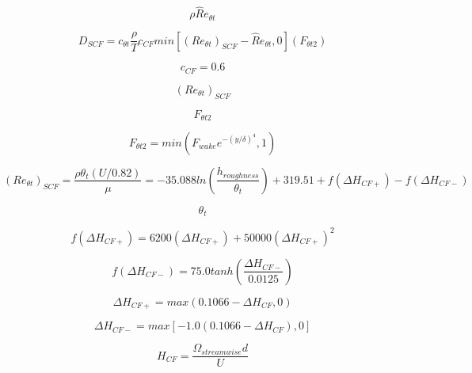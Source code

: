 

\begin{equation}
\rho\hat Re_{\theta t}
\end{equation}

\begin{equation}
D_{SCF} = c_{\theta t} \frac{\rho}{T} c_{CF} min
\left[(Re_{\theta t})_{SCF} - \hat Re_{\theta t}, 0 \right] (F_{\theta t 2})
\end{equation}

\begin{equation}
c_{CF} = 0.6
\end{equation}

\begin{equation}
(Re_{\theta t})_{SCF}
\end{equation}

\begin{equation}
F_{\theta t 2}
\end{equation}

\begin{equation}
F_{\theta t 2} = min \left(F_{wake} e^{-(y/\delta)^4}, 1 \right)
\end{equation}

\begin{equation}
(Re_{\theta t})_{SCF} = \frac{\rho \theta_t \left(U/0.82 \right)}{\mu} =
-35.088 ln \left( \frac{h_{roughness}}{\theta_t} \right) + 319.51 + f(\Delta H_{CF+}) - f(\Delta H_{CF-})
\end{equation}

\begin{equation}
\theta_t
\end{equation}

\begin{equation}
f(\Delta H_{CF+}) = 6200(\Delta H_{CF+}) + 50000(\Delta H_{CF+})^2
\end{equation}

\begin{equation}
f(\Delta H_{CF-}) = 75.0 tanh \left( \frac{\Delta H_{CF-}}{0.0125} \right)
\end{equation}

\begin{equation}
\Delta H_{CF+} = max(0.1066 - \Delta H_{CF}, 0)
\end{equation}

\begin{equation}
\Delta H_{CF-} = max[-1.0(0.1066 - \Delta H_{CF}), 0]
\end{equation}

\begin{equation}
H_{CF} = \frac{\Omega_{streamwise} d}{U}
\end{equation}

